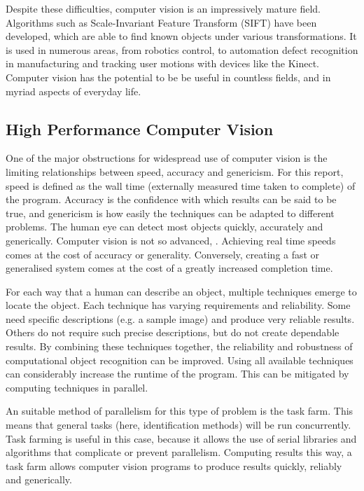 \documentclass[../main.tex]{subfiles}
\begin{document}
    Despite these difficulties, computer vision is an impressively mature field.
    Algorithms such as Scale-Invariant Feature Transform (SIFT)\cite{sift} have been developed, which are able to find known objects under various transformations.
    It is used in numerous areas, from robotics control, to automation defect recognition in manufacturing and tracking user motions with devices like the Kinect.
    Computer vision has the potential to be be useful in countless fields, and in myriad aspects of everyday life.


    \subsection{High Performance Computer Vision}
    One of the major obstructions for widespread use of computer vision is the limiting relationships between speed, accuracy and genericism.
    For this report, speed is defined as the wall time (externally measured time taken to complete) of the program.
    Accuracy is the confidence with which results can be said to be true, and genericism is how easily the techniques can be adapted to different problems.
    The human eye can detect most objects quickly, accurately and generically.
    Computer vision is not so advanced, .
    Achieving real time speeds comes at the cost of accuracy or generality.
    Conversely, creating a fast or generalised system comes at the cost of a greatly increased completion time.
    
    For each way that a human can describe an object, multiple techniques emerge to locate the object.
    Each technique has varying requirements and reliability.
    Some need specific descriptions (e.g. a sample image) and produce very reliable results.
    Others do not require such precise descriptions, but do not create dependable results.
    By combining these techniques together, the reliability and robustness of computational object recognition can be improved.
    Using all available techniques can considerably increase the runtime of the program.
    This can be mitigated by computing techniques in parallel.

    An suitable method of parallelism for this type of problem is the task farm.
    This means that general tasks (here, identification methods) will be run concurrently.
    Task farming is useful in this case, because it allows the use of serial libraries and algorithms that complicate or prevent parallelism.
    Computing results this way, a task farm allows computer vision programs to produce results quickly, reliably and generically.
\end{document}

